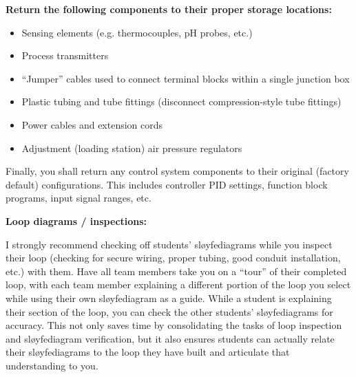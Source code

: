 {{\vskip 10pt

\indent
{\bf Return the following components to their proper storage locations:}

\begin{itemize}
\item{} Sensing elements (e.g. thermocouples, pH probes, etc.)
\item{} Process transmitters
\item{} ``Jumper'' cables used to connect terminal blocks within a single junction box
\item{} Plastic tubing and tube fittings (disconnect compression-style tube fittings)
\item{} Power cables and extension cords
\item{} Adjustment (loading station) air pressure regulators
\end{itemize}

\vskip 10pt

Finally, you shall return any control system components to their original (factory default) configurations.  This includes controller PID settings, function block programs, input signal ranges, etc.
















\noindent
{\bf Loop diagrams / inspections:}

I strongly recommend checking off students' sløyfediagrams while you inspect their loop (checking for secure wiring, proper tubing, good conduit installation, etc.) with them.  Have all team members take you on a ``tour'' of their completed loop, with each team member explaining a different portion of the loop you select while using their own sløyfediagram as a guide.  While a student is explaining their section of the loop, you can check the other students' sløyfediagrams for accuracy.  This not only saves time by consolidating the tasks of loop inspection and sløyfediagram verification, but it also ensures students can actually relate their sløyfediagrams to the loop they have built and articulate that understanding to you.

\vskip 10pt

}}
